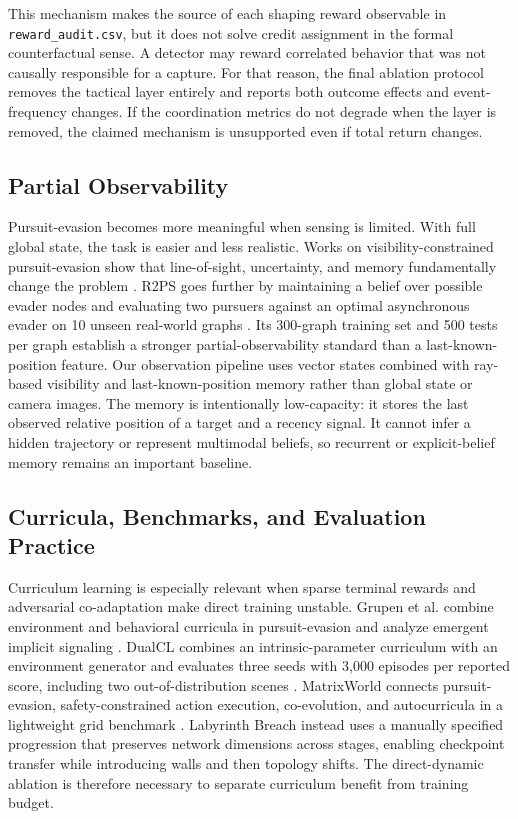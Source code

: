 \documentclass[journal]{IEEEtran}
\begin{document}
This mechanism makes the source of each shaping reward observable in \texttt{reward\_audit.csv}, but it does not solve credit assignment in the formal counterfactual sense. A detector may reward correlated behavior that was not causally responsible for a capture. For that reason, the final ablation protocol removes the tactical layer entirely and reports both outcome effects and event-frequency changes. If the coordination metrics do not degrade when the layer is removed, the claimed mechanism is unsupported even if total return changes.

\subsection{Partial Observability}

Pursuit-evasion becomes more meaningful when sensing is limited. With full global state, the task is easier and less realistic. Works on visibility-constrained pursuit-evasion show that line-of-sight, uncertainty, and memory fundamentally change the problem \cite{viper2025,gonultas2024,matrixworld2023}. R2PS goes further by maintaining a belief over possible evader nodes and evaluating two pursuers against an optimal asynchronous evader on 10 unseen real-world graphs \cite{lu2026r2ps}. Its 300-graph training set and 500 tests per graph establish a stronger partial-observability standard than a last-known-position feature. Our observation pipeline uses vector states combined with ray-based visibility and last-known-position memory rather than global state or camera images. The memory is intentionally low-capacity: it stores the last observed relative position of a target and a recency signal. It cannot infer a hidden trajectory or represent multimodal beliefs, so recurrent or explicit-belief memory remains an important baseline.

\subsection{Curricula, Benchmarks, and Evaluation Practice}

Curriculum learning is especially relevant when sparse terminal rewards and adversarial co-adaptation make direct training unstable. Grupen et al. combine environment and behavioral curricula in pursuit-evasion and analyze emergent implicit signaling \cite{grupen2021}. DualCL combines an intrinsic-parameter curriculum with an environment generator and evaluates three seeds with 3,000 episodes per reported score, including two out-of-distribution scenes \cite{chen2023dualcl}. MatrixWorld connects pursuit-evasion, safety-constrained action execution, co-evolution, and autocurricula in a lightweight grid benchmark \cite{matrixworld2023}. Labyrinth Breach instead uses a manually specified progression that preserves network dimensions across stages, enabling checkpoint transfer while introducing walls and then topology shifts. The direct-dynamic ablation is therefore necessary to separate curriculum benefit from training budget.
\end{document}
